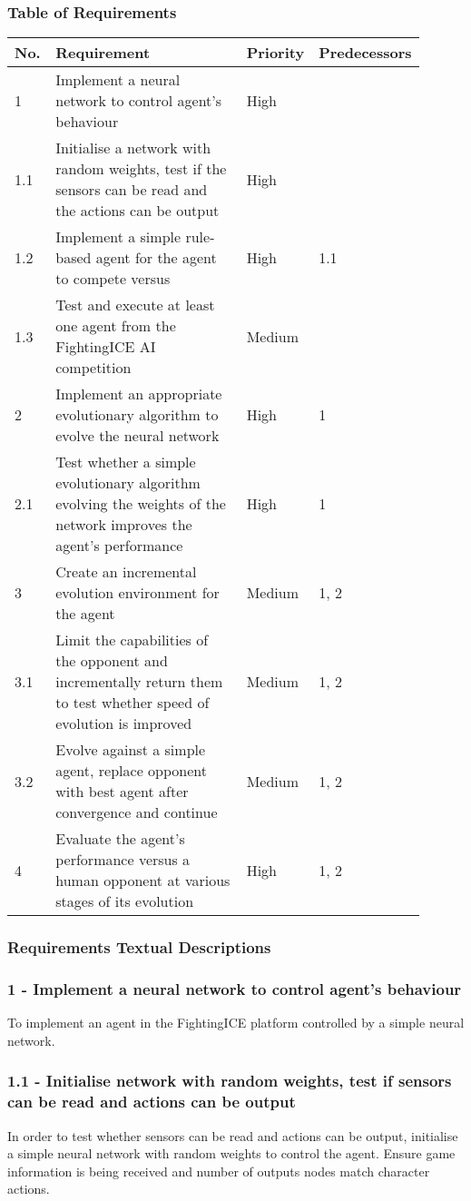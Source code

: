\documentclass[12pt,a4paper]{article}
\begin{document}
\subsubsection{Table of Requirements}
\begin{tabular}{|p{0.1\linewidth}|p{0.5\linewidth}|p{0.1\linewidth}|p{0.2\linewidth}|}
\hline
No. & Requirement & Priority & Predecessors\\ \hline
1 & Implement a neural network to control agent's behaviour & High &\\ \hline
1.1 & Initialise a network with random weights, test if the sensors can be read and the actions can be output & High &\\ \hline
1.2 & Implement a simple rule-based agent for the agent to compete versus & High & 1.1\\ \hline
1.3 & Test and execute at least one agent from the FightingICE AI competition & Medium &\\ \hline
2 & Implement an appropriate evolutionary algorithm to evolve the neural network & High & 1\\ \hline
2.1 & Test whether a simple evolutionary algorithm evolving the weights of the network improves the agent's performance & High & 1\\ \hline
3 & Create an incremental evolution environment for the agent & Medium & 1, 2\\ \hline
3.1 & Limit the capabilities of the opponent and incrementally return them to test whether speed of evolution is improved & Medium & 1, 2\\ \hline
3.2 & Evolve against a simple agent, replace opponent with best agent after convergence and continue & Medium & 1, 2\\ \hline 
4 & Evaluate the agent's performance versus a human opponent at various stages of its evolution & High & 1, 2\\ \hline
\end{tabular}
\newpage
\subsubsection{Requirements Textual Descriptions}
\subsubsection*{1 - Implement a neural network to control agent's behaviour}
To implement an agent in the FightingICE platform controlled by a simple neural network.
\subsubsection*{1.1 - Initialise network with random weights, test if sensors can be read and actions can be output}
In order to test whether sensors can be read and actions can be output, initialise a simple neural network with random weights to control the agent. Ensure game information is being received and number of outputs nodes match character actions.
\end{document}
